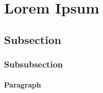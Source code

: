 \section{Lorem Ipsum}
\lipsum[1]

\subsection{Subsection}
\lipsum[2]

\subsubsection{Subsubsection}
\lipsum[3]

\paragraph{Paragraph}
\lipsum[4]